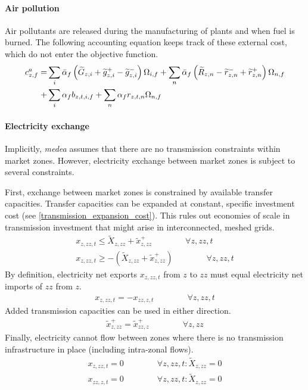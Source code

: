 \documentclass[review, 3p, times, 12pt, authoryear]{elsarticle}
\begin{document}
    \paragraph{Air pollution}
    Air pollutants are released during the manufacturing of plants and when fuel is burned. The following accounting equation keeps track of these external cost, which do not enter the objective function.
    \begin{align}
        \begin{split}
            c^{a}_{z,f} =&
            \sum_{i} \Bar{\alpha}_{f} \left(\widetilde{G}_{z,i}
            +\widetilde{g}^{+}_{z,i} -\widetilde{g}^{-}_{z,i}\right) \Omega_{i,f}
            + \sum_{n} \Bar{\alpha}_{f} \left( \widetilde{R}_{z,n} -\widetilde{r}^{-}_{z,n} +\widetilde{r}^{+}_{z,n}\right) \Omega_{n,f}
            \\
            + &\sum_{i} \alpha_{f} b_{z,t,i,f}
            + \sum_{n} \alpha_{f} r_{z,t,n} \Omega_{n,f}
        \end{split}
    \end{align}

    \paragraph{Electricity exchange}
    Implicitly, \emph{medea} assumes that there are no transmission constraints within market zones.
    However, electricity exchange between market zones is subject to several constraints.

    First, exchange between market zones is constrained by available transfer capacities. Transfer capacities can be
    expanded at constant, specific investment cost (see \autoref{transmission_expansion_cost}).
    This rules out economies of scale in transmission investment that might arise in interconnected, meshed grids.
    \begin{align}
        x_{z,zz,t} \leq \widetilde{X}_{z,zz} + \widetilde{x}^{+}_{z,zz}\qquad \qquad \forall z, zz, t\\
        x_{z,zz,t}\geq-\left( \widetilde{X}_{z,zz} +\widetilde{x}^{+}_{z,zz}\right)\qquad \qquad \forall z, zz, t
    \end{align}
    By definition, electricity net exports $x_{z,zz,t}$ from $z$ to $zz$ must equal electricity net imports of $zz$ from $z$.
    \begin{align}
        x_{z,zz,t} = -x_{zz,z,t} \qquad \qquad \forall z, zz, t
    \end{align}
    Added transmission capacities can be used in either direction.
    \begin{align}
        \widetilde{x}^{+}_{z,zz} = \widetilde{x}^{+}_{zz,z}\qquad \qquad \forall z, zz
    \end{align}
    Finally, electricity cannot flow between zones where there is no transmission infrastructure in place (including
    intra-zonal flows).
    \begin{align}
        x_{z,zz,t} = 0 \qquad \qquad \forall z, zz, t:\widetilde{X}_{z,zz} = 0\\
        x_{zz,z,t} = 0\qquad \qquad \forall z, zz, t:\widetilde{X}_{z,zz} = 0
    \end{align}
\end{document}
